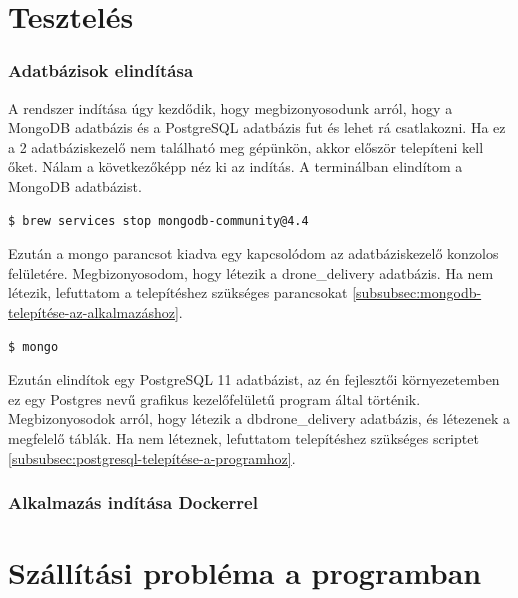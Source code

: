 \section{Tesztelés}
\subsubsection{Adatbázisok elindítása}
A rendszer indítása úgy kezdődik, hogy megbizonyosodunk arról, hogy a MongoDB adatbázis és a PostgreSQL adatbázis fut és lehet rá csatlakozni.
Ha ez a 2 adatbáziskezelő nem található meg gépünkön, akkor először telepíteni kell őket.
Nálam a következőképp néz ki az indítás. A terminálban elindítom a MongoDB adatbázist.
\begin{lstlisting}[language=bash]
  $ brew services stop mongodb-community@4.4
\end{lstlisting}

Ezután a mongo parancsot kiadva egy kapcsolódom az adatbáziskezelő konzolos felületére.
Megbizonyosodom, hogy létezik a drone\_delivery adatbázis.
Ha nem létezik, lefuttatom a telepítéshez szükséges parancsokat \ref{subsubsec:mongodb-telepítése-az-alkalmazáshoz}.
\begin{lstlisting}[language=bash]
  $ mongo
\end{lstlisting}


Ezután elindítok egy PostgreSQL 11 adatbázist, az én fejlesztői környezetemben ez egy Postgres nevű grafikus kezelőfelületű program által történik.
Megbizonyosodok arról, hogy létezik a dbdrone\_delivery adatbázis, és létezenek a megfelelő táblák. Ha nem léteznek, lefuttatom telepítéshez szükséges scriptet \ref{subsubsec:postgresql-telepítése-a-programhoz}.

\subsubsection{Alkalmazás indítása Dockerrel}


\section{Szállítási probléma a programban}
